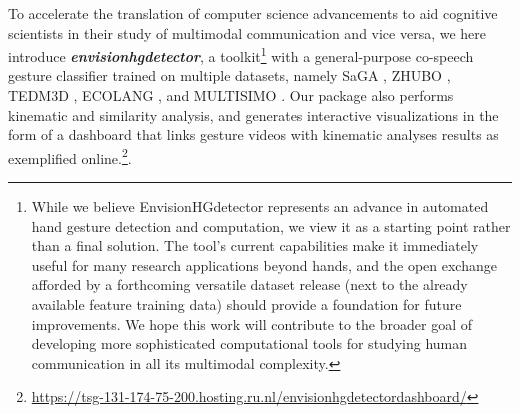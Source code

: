 \documentclass[11pt,headings=small,cleardoublepage=empty,tocflat,numbers=noenddot,twoside,captions=tableheading]{scrbook}
\begin{document}
\begin{refsection}
To accelerate the translation of computer science advancements to aid cognitive scientists in their study of multimodal communication and vice versa, we here introduce \textit{\textbf{envisionhgdetector}}, a toolkit\footnote{While we believe EnvisionHGdetector represents an advance in automated hand gesture detection and computation, we view it as a starting point rather than a final solution. The tool's current capabilities make it immediately useful for many research applications beyond hands, and the open exchange afforded by a forthcoming versatile dataset release (next to the already available feature training data) should provide a foundation for future improvements. We hope this work will contribute to the broader goal of developing more sophisticated computational tools for studying human communication in all its multimodal complexity.} with a general-purpose co-speech gesture classifier trained on multiple datasets, namely SaGA \parencite{luckingBielefeldSpeechGesture2010}, ZHUBO \parencite{baoEditableCoSpeechGesture2024}, TEDM3D \parencite{rohrerTemporalPragmaticAnalysis2022}, ECOLANG \parencite{guECOLANGMultimodalCorpus2025}, and MULTISIMO \parencite{koutsombogeraModelingCollaborativeMultimodal2018, koutsombogeraMULTISIMOMultimodalCorpus2017}. Our package also performs kinematic and similarity analysis, and  generates interactive visualizations in the form of a dashboard that links gesture videos with kinematic analyses results as exemplified online.\footnote{\url{https://tsg-131-174-75-200.hosting.ru.nl/envisionhgdetectordashboard/}}. 

\end{refsection}
\end{document}
